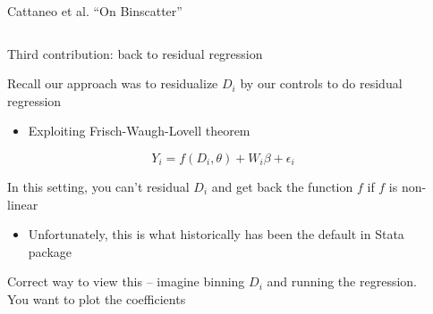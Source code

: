 \documentclass[notes,11pt, aspectratio=169]{beamer}
\newcommand\1{\operatorname{\mathbbm{1}}\indicatorfence}
\newenvironment{wideitemize}{\itemize\addtolength{\itemsep}{10pt}}{\enditemize}
\begin{document}
\begin{frame}{Cattaneo et al. ``On Binscatter''}
  \begin{columns}[T] %
    \begin{column}{.5\textwidth}
      \begin{wideitemize}
      \item Third contribution: back to residual regression
      \item Recall our approach was to residualize $D_{i}$ by our
        controls to do residual regression
        \begin{itemize}
        \item Exploiting Frisch-Waugh-Lovell theorem
        \end{itemize}
        $$ Y_{i} = f(D_{i},\theta) + W_{i}\beta + \epsilon_{i}$$
      \item In this setting, you can't residual $D_{i}$ and get back
        the function $f$ if $f$ is non-linear
        \begin{itemize}
        \item Unfortunately, this is what historically has been the default in Stata package
        \end{itemize}
      \item Correct way to view this -- imagine binning $D_{i}$ and
        running the regression. You want to plot the coefficients
  \end{wideitemize}
  \end{column}%
  \hfill%
  \begin{column}{.5\textwidth}
  \end{column}
\end{columns}
\end{frame}
\end{document}
